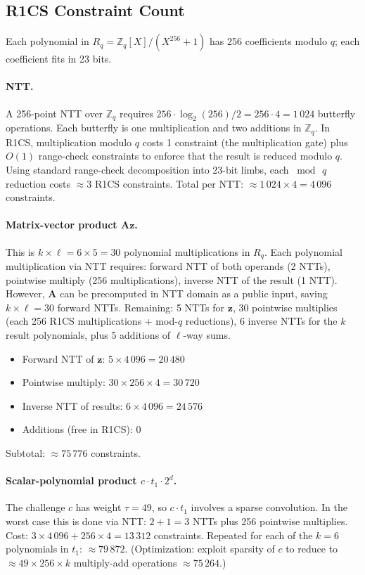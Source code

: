 \documentclass[11pt]{article}
\begin{document}
\subsection{R1CS Constraint Count}

Each polynomial in $R_q = \mathbb{Z}_q[X]/(X^{256}+1)$ has 256
coefficients modulo $q$; each coefficient fits in 23 bits.

\paragraph{NTT.}
A 256-point NTT over $\mathbb{Z}_q$ requires $256 \cdot \log_2(256) / 2
= 256 \cdot 4 = 1\,024$ butterfly operations. Each butterfly is
one multiplication and two additions in $\mathbb{Z}_q$.  In R1CS,
multiplication modulo $q$ costs 1 constraint (the multiplication gate)
plus $O(1)$ range-check constraints to enforce that the result is reduced
modulo $q$.  Using standard range-check decomposition into 23-bit limbs,
each $\bmod\,q$ reduction costs $\approx 3$ R1CS constraints.  Total
per NTT: $\approx 1\,024 \times 4 = 4\,096$ constraints.

\paragraph{Matrix-vector product $\mathbf{A}\mathbf{z}$.}
This is $k \times \ell = 6 \times 5 = 30$ polynomial multiplications
in $R_q$.  Each polynomial multiplication via NTT requires: forward NTT
of both operands (2 NTTs), pointwise multiply (256 multiplications),
inverse NTT of the result (1 NTT).  However, $\mathbf{A}$ can be
precomputed in NTT domain as a public input, saving $k \times \ell = 30$
forward NTTs.  Remaining: 5 NTTs for $\mathbf{z}$, 30 pointwise
multiplies (each 256 R1CS multiplications + mod-$q$ reductions), 6
inverse NTTs for the $k$ result polynomials, plus 5 additions of
$\ell$-way sums.

\begin{itemize}[nosep]
  \item Forward NTT of $\mathbf{z}$: $5 \times 4\,096 = 20\,480$
  \item Pointwise multiply: $30 \times 256 \times 4 = 30\,720$
  \item Inverse NTT of results: $6 \times 4\,096 = 24\,576$
  \item Additions (free in R1CS): 0
\end{itemize}
Subtotal: $\approx 75\,776$ constraints.

\paragraph{Scalar-polynomial product $c \cdot t_1 \cdot 2^d$.}
The challenge $c$ has weight $\tau = 49$, so $c \cdot t_1$ involves a
sparse convolution.  In the worst case this is done via NTT:
$2 + 1 = 3$ NTTs plus 256 pointwise multiplies.
Cost: $3 \times 4\,096 + 256 \times 4 = 13\,312$ constraints.  Repeated
for each of the $k = 6$ polynomials in $t_1$: $\approx 79\,872$.
(Optimization: exploit sparsity of $c$ to reduce to $\approx 49 \times
256 \times k$ multiply-add operations $\approx 75\,264$.)
\end{document}
